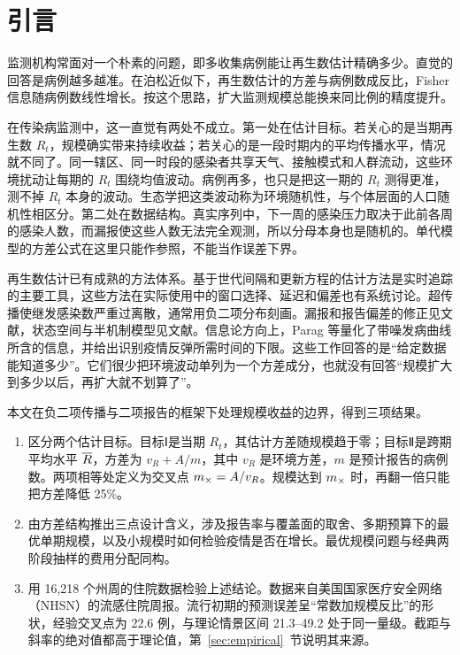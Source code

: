 \section{引言}
\label{sec:intro}

监测机构常面对一个朴素的问题，即多收集病例能让再生数估计精确多少。直觉的回答是病例越多越准。在泊松近似下，再生数估计的方差与病例数成反比，Fisher 信息随病例数线性增长\citep{parag2022quantifying}。按这个思路，扩大监测规模总能换来同比例的精度提升。

在传染病监测中，这一直觉有两处不成立。第一处在估计目标。若关心的是当期再生数 $R_t$，规模确实带来持续收益；若关心的是一段时期内的平均传播水平，情况就不同了。同一辖区、同一时段的感染者共享天气、接触模式和人群流动，这些环境扰动让每期的 $R_t$ 围绕均值波动\citep{dalziel2018urbanization, rasmussen2011inference}。病例再多，也只是把这一期的 $R_t$ 测得更准，测不掉 $R_t$ 本身的波动。生态学把这类波动称为环境随机性，与个体层面的人口随机性相区分\citep{engen1998demographic, rohani2002determinism}。第二处在数据结构。真实序列中，下一周的感染压力取决于此前各周的感染人数，而漏报使这些人数无法完全观测，所以分母本身也是随机的。单代模型的方差公式在这里只能作参照，不能当作误差下界。

再生数估计已有成熟的方法体系。基于世代间隔和更新方程的估计方法是实时追踪的主要工具\citep{wallinga2004different, fraser2007estimating, cori2013new}，这些方法在实际使用中的窗口选择、延迟和偏差也有系统讨论\citep{thompson2019improved, gostic2020practical, nouvellet2018simple, steyn2025primer}。超传播使继发感染数严重过离散，通常用负二项分布刻画\citep{lloydsmith2005superspreading, endo2020estimating, kucharski2020early}。漏报和报告偏差的修正见文献\citep{azmon2014estimating, stoner2019hierarchical, bracher2021marginal}，状态空间与半机制模型见文献\citep{breto2009time, bhatt2023semi}。信息论方向上，Parag 等量化了带噪发病曲线所含的信息，并给出识别疫情反弹所需时间的下限\citep{parag2022quantifying, parag2022fundamental, parag2025asymmetric}。这些工作回答的是“给定数据能知道多少”。它们很少把环境波动单列为一个方差成分，也就没有回答“规模扩大到多少以后，再扩大就不划算了”。

本文在负二项传播与二项报告的框架下处理规模收益的边界，得到三项结果。
\begin{enumerate}
  \item 区分两个估计目标。目标Ⅰ是当期 $R_t$，其估计方差随规模趋于零；目标Ⅱ是跨期平均水平 $\overline{R}$，方差为 $v_R+A/m$，其中 $v_R$ 是环境方差，$m$ 是预计报告的病例数。两项相等处定义为交叉点 $m_{\times}=A/v_R$。规模达到 $m_{\times}$ 时，再翻一倍只能把方差降低 25\%。
  \item 由方差结构推出三点设计含义，涉及报告率与覆盖面的取舍、多期预算下的最优单期规模，以及小规模时如何检验疫情是否在增长。最优规模问题与经典两阶段抽样的费用分配同构\citep{cochran1977sampling}。
  \item 用 16,218 个州周的住院数据检验上述结论。数据来自美国国家医疗安全网络（NHSN）的流感住院周报\citep{cdc2026nhsn}。流行初期的预测误差呈“常数加规模反比”的形状，经验交叉点为 22.6 例，与理论情景区间 21.3--49.2 处于同一量级。截距与斜率的绝对值都高于理论值，第~\ref{sec:empirical}~节说明其来源。
\end{enumerate}

